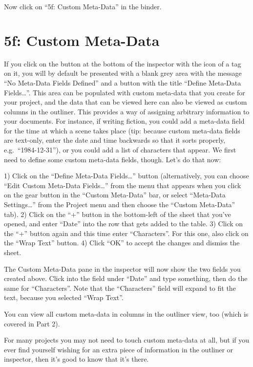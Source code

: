 \documentclass[10pt,oneside]{memoir}
\begin{document}
Now click on ``5f: Custom Meta-Data'' in the binder.


\pagebreak \section{5f: Custom Meta-Data}
\label{f:custommeta-data}

If you click on the button at the bottom of the inspector with the icon of a tag on it, you will by default be presented with a blank grey area with the message ``No Meta-Data Fields Defined'' and a button with the title ``Define Meta-Data Fields{\ldots}''. This area can be populated with custom meta-data that you create for your project, and the data that can be viewed here can also be viewed as custom columns in the outliner. This provides a way of assigning arbitrary information to your documents. For instance, if writing fiction, you could add a meta-data field for the time at which a scene takes place (tip: because custom meta-data fields are text-only, enter the date and time backwards so that it sorts properly, e.g.\ ``1984-12-31''), or you could add a list of characters that appear.
We first need to define some custom meta-data fields, though. Let's do that now:


1)  Click on the ``Define Meta-Data Fields{\ldots}'' button (alternatively, you can choose ``Edit Custom Meta-Data Fields{\ldots}'' from the menu that appears when you click on the gear button in the ``Custom Meta-Data'' bar, or select ``Meta-Data Settings{\ldots}'' from the Project menu and then choose the ``Custom Meta-Data'' tab).
2)  Click on the ``+'' button in the bottom-left of the sheet that you've opened, and enter ``Date'' into the row that gets added to the table.
3)  Click on the ``+'' button again and this time enter ``Characters''. For this one, also click on the ``Wrap Text'' button.
4) Click ``OK'' to accept the changes and dismiss the sheet.


The Custom Meta-Data pane in the inspector will now show the two fields you created above. Click into the field under ``Date'' and type something, then do the same for ``Characters''. Note that the ``Characters'' field will expand to fit the text, because you selected ``Wrap Text''.


You can view all custom meta-data in columns in the outliner view, too (which is covered in Part 2).


For many projects you may not need to touch custom meta-data at all, but if you ever find yourself wishing for an extra piece of information in the outliner or inspector, then it's good to know that it's there.
\end{document}
